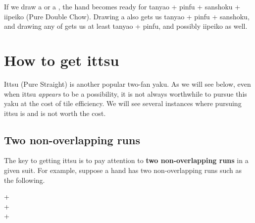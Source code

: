 \bp
{}
\ep
If we draw a {\large{}} or a {\large{}}, the hand becomes ready for {\jap tanyao + pinfu + sanshoku + iipeiko} (Pure Double Chow). Drawing a {\large{}} also gets us {\jap tanyao + pinfu + sanshoku}, and drawing any of {\large{}  } gets us at least {\jap tanyao + pinfu}, and possibly {\jap iipeiko} as well. 

\newpage
\section{How to get {\jap ittsu}}\label{sec:itt}

{\jap Ittsu} (Pure Straight) is another popular two-{\jap fan yaku}. As we will see below, even when {\jap ittsu} \emph{appears} to be a possibility, it is not always worthwhile to pursue this {\jap yaku} at the cost of tile efficiency. We will see several instances where pursuing {\jap ittsu} is and is not worth the cost.

\subsection{Two non-overlapping runs}
The key to getting {\jap ittsu} is to pay attention to {\bf two non-overlapping runs} in a given suit. For example, suppose a hand has two non-overlapping runs such as the following. 


{\begin{center}\LARGE
{}+\\
+\\
+\\
\end{center}}


